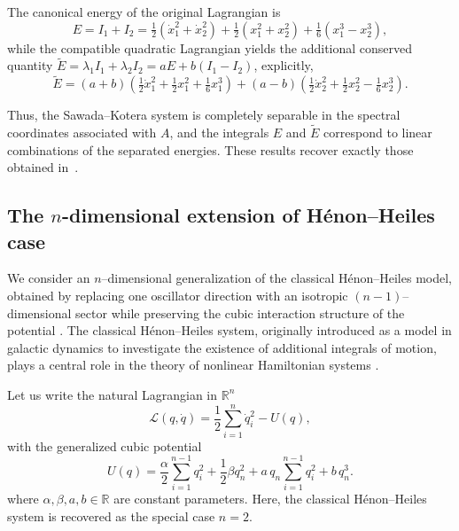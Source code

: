 \documentclass{rendiconti}
\begin{document}
The canonical energy of the original Lagrangian is
\begin{equation}
E=I_1+I_2
=\tfrac12(\dot x_1^2+\dot x_2^2)
+\tfrac12(x_1^2+x_2^2)
+\tfrac16(x_1^3-x_2^3),
\end{equation}
while the compatible quadratic Lagrangian yields the additional conserved
quantity
$\widetilde E=\lambda_1 I_1+\lambda_2 I_2
=aE+b(I_1-I_2)$, explicitly,
\begin{equation}
\widetilde E=
(a+b)\!\left(\tfrac12\dot x_1^2+\tfrac12 x_1^2+\tfrac16 x_1^3\right)
+(a-b)\!\left(\tfrac12\dot x_2^2+\tfrac12 x_2^2-\tfrac16 x_2^3\right).
\end{equation}

Thus, the Sawada--Kotera system is completely separable in the spectral
coordinates associated with $A$, and the integrals $E$ and $\widetilde E$
correspond to linear combinations of the separated energies. These results
recover exactly those obtained in~\cite{GorniScomparinZampieri2024}.


\subsection{The $n$-dimensional extension of H\'enon--Heiles case}
\label{sec:HHhigher}

We consider an $n$--dimensional generalization of the classical H\'enon--Heiles
model, obtained by replacing one oscillator direction with an isotropic
$(n-1)$--dimensional sector while preserving the cubic interaction structure of the potential \cite{HenonHeiles1964}.
The classical H\'enon--Heiles system, originally introduced as a model in
galactic dynamics to investigate the existence of additional integrals of
motion, plays a central role in the theory of nonlinear Hamiltonian systems \cite{BlaszakRauchWojciechowski1994}.

Let us write  the natural Lagrangian in $\mathbb{R}^n$
\begin{equation}
\mathcal{L}(q,\dot{q}) = \frac{1}{2} \sum_{i=1}^n \dot{q}_i^2 - U(q),
\end{equation}
with the generalized cubic potential
\begin{equation}
U(q) = \frac{\alpha}{2} \sum_{i=1}^{n-1} q_i^2 + \frac{1}{2} \beta q_n^2 + a\, q_n \sum_{i=1}^{n-1} q_i^2 + b\, q_n^3.
\end{equation}
where $\alpha,\beta,a,b\in \mathbb{R}$ are constant parameters. Here, the classical H\'enon--Heiles system is recovered as the special case $n=2$.
\end{document}
